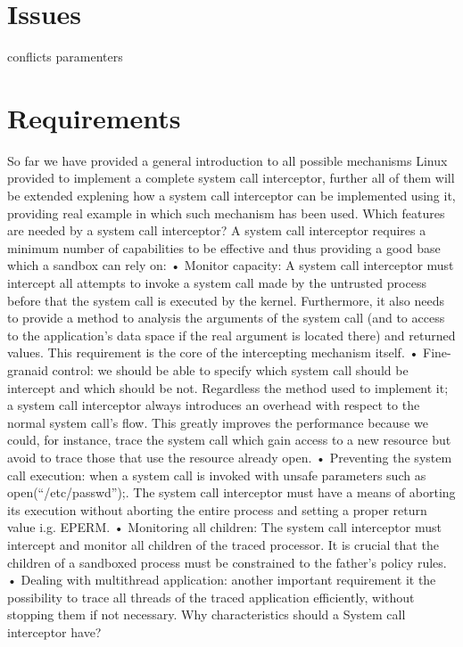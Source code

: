 \section{Issues}

conflicts paramenters

\section{Requirements}
So far we have provided a general introduction to all possible mechanisms Linux provided to implement a complete system call interceptor, further all of them will be extended explening how a system call interceptor can be implemented using it, providing real example in which such mechanism has been used.
Which features are needed by a system call interceptor?
A system call interceptor requires a minimum number of capabilities to be effective and thus providing a good base which a sandbox can rely on:
•	Monitor capacity:  A system call interceptor must intercept all attempts to invoke a system call made by the untrusted process before that the system call is executed by the kernel. Furthermore, it also needs to provide a method to analysis the arguments of the system call (and to access to the application’s data space if the real argument is located there) and returned values. This requirement is the core of the intercepting mechanism itself.  
•	Fine-granaid control: we should be able to specify which system call should be intercept and which should be not. Regardless the method used to implement it; a system call interceptor always introduces an overhead with respect to the normal system call’s flow. This greatly improves the performance because we could, for instance, trace the system call which gain access to a new resource but avoid to trace those that use the resource already open.    
•	Preventing the system call execution: when a system call is invoked with unsafe parameters such as open(“/etc/passwd”);. The system call interceptor must have a means of aborting its execution without aborting the entire process and setting a proper return value i.g. EPERM. 
•	Monitoring all children:  The system call interceptor must intercept and monitor all children of the traced processor. It is crucial that the children of a sandboxed process must be constrained to the father's policy rules.
•	Dealing with multithread application: another important requirement it the possibility to trace all threads of the traced application efficiently, without stopping them if not necessary. 
Why characteristics should a System call interceptor have? 



